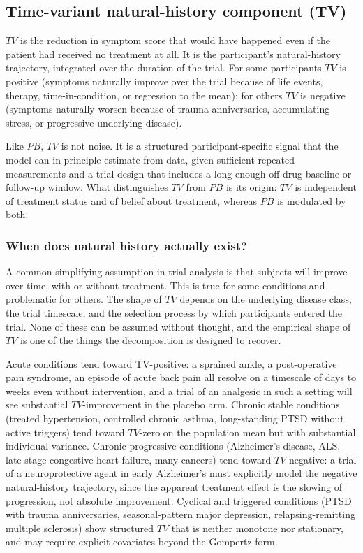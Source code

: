 \documentclass[
  11pt,
]{article}
\begin{document}
\subsection{Time-variant natural-history component (TV)}\label{time-variant-natural-history-component-tv}

\(TV\) is the reduction in symptom score that would have happened even if the
patient had received no treatment at all. It is the participant's
natural-history trajectory, integrated over the duration of the trial. For
some participants \(TV\) is positive (symptoms naturally improve over the trial
because of life events, therapy, time-in-condition, or regression to the
mean); for others \(TV\) is negative (symptoms naturally worsen because of
trauma anniversaries, accumulating stress, or progressive underlying disease).

Like \(PB\), \(TV\) is not noise. It is a structured participant-specific signal
that the model can in principle estimate from data, given sufficient repeated
measurements and a trial design that includes a long enough off-drug baseline
or follow-up window. What distinguishes \(TV\) from \(PB\) is its origin: \(TV\) is
independent of treatment status and of belief about treatment, whereas \(PB\) is
modulated by both.

\subsubsection{When does natural history actually exist?}\label{when-does-natural-history-actually-exist}

A common simplifying assumption in trial analysis is that subjects will
improve over time, with or without treatment. This is true for some conditions
and problematic for others. The shape of \(TV\) depends on the underlying
disease class, the trial timescale, and the selection process by which
participants entered the trial. None of these can be assumed without thought,
and the empirical shape of \(TV\) is one of the things the decomposition is
designed to recover.

Acute conditions tend toward TV-positive: a sprained ankle, a post-operative
pain syndrome, an episode of acute back pain all resolve on a timescale of
days to weeks even without intervention, and a trial of an analgesic in such a
setting will see substantial \(TV\)-improvement in the placebo arm. Chronic
stable conditions (treated hypertension, controlled chronic asthma,
long-standing PTSD without active triggers) tend toward \(TV\)-zero on the
population mean but with substantial individual variance. Chronic progressive
conditions (Alzheimer's disease, ALS, late-stage congestive heart failure,
many cancers) tend toward \(TV\)-negative: a trial of a neuroprotective agent in
early Alzheimer's must explicitly model the negative natural-history
trajectory, since the apparent treatment effect is the slowing of progression,
not absolute improvement. Cyclical and triggered conditions (PTSD with trauma
anniversaries, seasonal-pattern major depression, relapsing-remitting multiple
sclerosis) show structured \(TV\) that is neither monotone nor stationary, and
may require explicit covariates beyond the Gompertz form.
\end{document}
